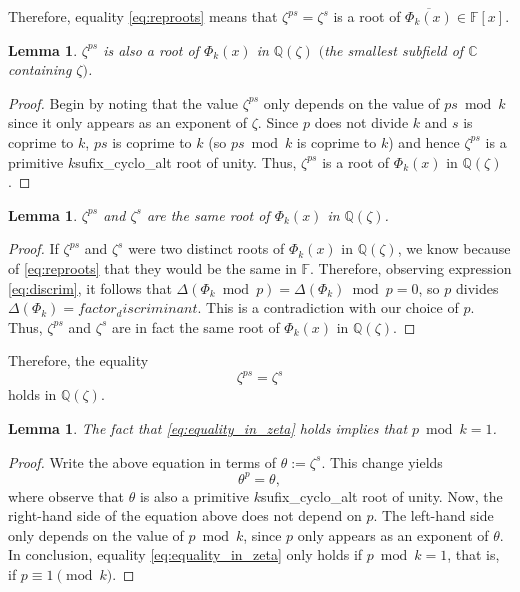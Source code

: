 \documentclass[a4paper, 12pt]{article}
\newtheorem{lemma}[theorem]{Lemma}
\theoremstyle{definition}
\newcommand{\Q}{\ensuremath{\mathbb{Q}}}
\newcommand{\C}{\ensuremath{\mathbb{C}}}
\newcommand{\F}{\ensuremath{\mathbb{F}}}
\begin{document}
Therefore, equality \eqref{eq:reproots} means that $\zeta^{ps}=\zeta^{s}$ is a root of $\overline{\Phi_{{k}}(x)}\in\F[x]$. 

\begin{lemma}
$\zeta^{ps}$ is also a root of $\Phi_{{k}}(x)$ in $\Q(\zeta)$ $($the smallest subfield of $\C$ containing $\zeta)$.
\end{lemma}
\begin{proof}
Begin by noting that the value $\zeta^{ps}$ only depends on the value of $ps \bmod{{k}}$ since it only appears as an exponent of $\zeta$. Since $p$ does not divide ${k}$ and $s$ is coprime to ${k}$, $ps$ is coprime to ${k}$ (so $ps \bmod{{k}}$ is coprime to ${k}$) and hence $\zeta^{ps}$ is a primitive ${k}${sufix_cyclo_alt} root of unity. Thus, $\zeta^{ps}$ is a root of $\Phi_{{k}}(x)$ in $\Q(\zeta)$.
\end{proof}

\begin{lemma}
$\zeta^{ps}$ and $\zeta^{s}$ are the same root of $\Phi_{{k}}(x)$ in $\Q(\zeta)$.
\end{lemma}
\begin{proof}
If $\zeta^{ps}$ and $\zeta^{s}$ were two distinct roots of $\Phi_{{k}}(x)$ in $\Q(\zeta)$, we know because of \eqref{eq:reproots} that they would be the same in $\F$. Therefore, observing expression \eqref{eq:discrim}, it follows that $\Delta(\Phi_{{k}} \bmod{p})=\Delta(\Phi_{{k}}) \bmod{p}=0$, so $p$ divides $\Delta(\Phi_{{k}})={factor_discriminant}$. This is a contradiction with our choice of $p$. Thus, $\zeta^{ps}$ and $\zeta^{s}$ are in fact the same root of $\Phi_{{k}}(x)$ in $\Q(\zeta)$.
\end{proof}

Therefore, the equality
\begin{equation}\label{eq:equality_in_zeta}
\zeta^{ps}=\zeta^{s}
\end{equation}
holds in $\Q(\zeta)$. 
\begin{lemma}
The fact that \eqref{eq:equality_in_zeta} holds implies that $p \bmod{{k}}=1$.
\end{lemma}
\begin{proof}
Write the above equation in terms of $\theta:=\zeta^{s}$. This change yields
\begin{equation*}
\theta^{p}=\theta,
\end{equation*}
where observe that $\theta$ is also a primitive ${k}${sufix_cyclo_alt} root of unity. Now, the right-hand side of the equation above does not depend on $p$. The left-hand side only depends on the value of $p\bmod{{k}}$, since $p$ only appears as an exponent of $\theta$. In conclusion, equality \eqref{eq:equality_in_zeta} only holds if $p \bmod{{k}}=1$, that is, if $p\equiv 1\pmod{{k}}$.
\end{proof}
\end{document}
